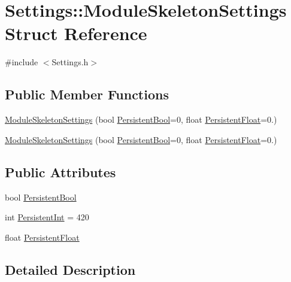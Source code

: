 \hypertarget{struct_settings_1_1_module_skeleton_settings}{}\section{Settings\+:\+:Module\+Skeleton\+Settings Struct Reference}
\label{struct_settings_1_1_module_skeleton_settings}


{\ttfamily \#include $<$Settings.\+h$>$}

\subsection*{Public Member Functions}
\begin{DoxyCompactItemize}
\item 
\hyperlink{struct_settings_1_1_module_skeleton_settings_aaf2674e74aa94aa8adc8b22ab33e761a}{Module\+Skeleton\+Settings} (bool \hyperlink{struct_settings_1_1_module_skeleton_settings_a9317af6534db8ce6a4f78a20a1459ffa}{Persistent\+Bool}=0, float \hyperlink{struct_settings_1_1_module_skeleton_settings_afef04c5f2726be746af4bc8ade592992}{Persistent\+Float}=0.)
\item 
\hyperlink{struct_settings_1_1_module_skeleton_settings_aaf2674e74aa94aa8adc8b22ab33e761a}{Module\+Skeleton\+Settings} (bool \hyperlink{struct_settings_1_1_module_skeleton_settings_a9317af6534db8ce6a4f78a20a1459ffa}{Persistent\+Bool}=0, float \hyperlink{struct_settings_1_1_module_skeleton_settings_afef04c5f2726be746af4bc8ade592992}{Persistent\+Float}=0.)
\end{DoxyCompactItemize}
\subsection*{Public Attributes}
\begin{DoxyCompactItemize}
\item 
bool \hyperlink{struct_settings_1_1_module_skeleton_settings_a9317af6534db8ce6a4f78a20a1459ffa}{Persistent\+Bool}
\item 
int \hyperlink{struct_settings_1_1_module_skeleton_settings_a82f829b4659c8a46bb76719fab4381f3}{Persistent\+Int} = 420
\item 
float \hyperlink{struct_settings_1_1_module_skeleton_settings_afef04c5f2726be746af4bc8ade592992}{Persistent\+Float}
\end{DoxyCompactItemize}


\subsection{Detailed Description}


